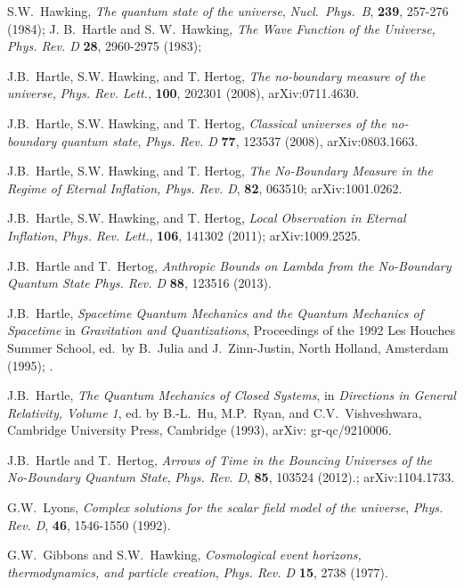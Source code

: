 \documentclass[prd,floats,superscriptaddress,eqsecnum,floatfix,nofootinbib,12pt]{revtex4}
\newcommand{\ttle}[1]{{\it #1}}
\begin{document}
{{{{ 
\begin{thebibliography}{99}

S.W.~Hawking, \ttle{\it The quantum state of the universe},
{\sl Nucl.~Phys.~B}, {\bf 239}, 257-276 (1984); J. B.~Hartle and S. W.~Hawking, \ttle{The Wave Function of the Universe,} {\sl Phys. Rev. D} {\bf 28}, 2960-2975 (1983); 

 J.B.~Hartle, S.W. Hawking, and T. Hertog, \ttle{\it The no-boundary measure of the universe,} {\sl Phys. Rev. Lett.},  {\bf 100}, 202301 (2008), arXiv:0711.4630.

 J.B.~Hartle, S.W. Hawking, and T. Hertog, \ttle{\it Classical universes of the no-boundary quantum state}, {\sl Phys. Rev. D} {\bf  77}, 123537 (2008), arXiv:0803.1663.

 J.B.~Hartle, S.W. Hawking, and T. Hertog, \ttle{\it The No-Boundary Measure in the Regime of Eternal Inflation,} {\sl Phys. Rev. D}, {\bf 82}, 063510; arXiv:1001.0262.

 J.B.~Hartle, S.W. Hawking, and T. Hertog, \ttle{\it Local Observation in Eternal Inflation}, {\sl Phys. Rev. Lett.}, {\bf 106}, 141302 (2011); arXiv:1009.2525.

 J.B.~Hartle and T.~Hertog, {\it Anthropic Bounds on Lambda from the No-Boundary Quantum State}
{\sl Phys. Rev. D} {\bf 88}, 123516 (2013).

 J.B.~Hartle, {\it Spacetime Quantum Mechanics and the Quantum Mechanics of Spacetime} in {\sl 
Gravitation and Quantizations}, Proceedings of the 1992 Les Houches Summer School, ed.~by B.~Julia and J.~Zinn-Justin,  North Holland, Amsterdam (1995); .

 J.B.~Hartle, {\it The Quantum Mechanics of Closed Systems}, in {\sl Directions in General Relativity,
Volume 1}, ed. by B.-L.~Hu, M.P.~Ryan, and C.V.~Vishveshwara, Cambridge University Press, Cambridge (1993), arXiv: gr-qc/9210006.

 J.B.~Hartle and T.~Hertog,  \ttle{\it Arrows of Time in the Bouncing Universes of the No-Boundary Quantum State}, {\sl Phys. Rev. D}, {\bf 85}, 103524 (2012).; arXiv:1104.1733. 

 G.W.~Lyons, {\it Complex solutions for the scalar field model of the universe}, {\sl Phys. Rev. D}, {\bf 46}, 1546-1550 (1992).

 G.W.~Gibbons and S.W.~Hawking, {\it Cosmological event horizons, thermodynamics, and particle creation},  {\sl Phys. Rev. D} {\bf 15}, 2738 (1977). 


\end{thebibliography}}}}}
\end{document}
